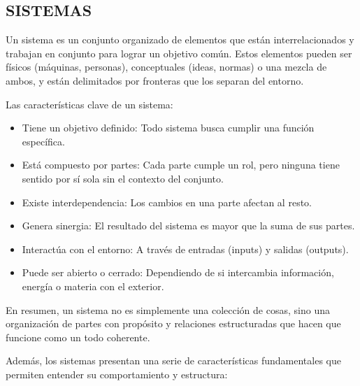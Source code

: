 \documentclass[a4paper,oneside,11pt]{article}
\begin{document}
\subsection{SISTEMAS}
    
    Un sistema es un conjunto organizado de elementos que están interrelacionados y trabajan en conjunto para lograr un objetivo común. Estos elementos pueden ser físicos (máquinas, personas), conceptuales (ideas, normas) o una mezcla de ambos, y están delimitados por fronteras que los separan del entorno.
    
    Las características clave de un sistema:
    \begin{itemize}
        \item Tiene un objetivo definido: Todo sistema busca cumplir una función específica.
        \item Está compuesto por partes: Cada parte cumple un rol, pero ninguna tiene sentido por sí sola sin el contexto del conjunto.
        \item Existe interdependencia: Los cambios en una parte afectan al resto.
        \item Genera sinergia: El resultado del sistema es mayor que la suma de sus partes.
        \item Interactúa con el entorno: A través de entradas (inputs) y salidas (outputs).
        \item Puede ser abierto o cerrado: Dependiendo de si intercambia información, energía o materia con el exterior.
    \end{itemize}
    
    En resumen, un sistema no es simplemente una colección de cosas, sino una organización de partes con propósito y relaciones estructuradas que hacen que funcione como un todo coherente.
    
    Además, los sistemas presentan una serie de características fundamentales que permiten entender su comportamiento y estructura:
    
\end{document}
